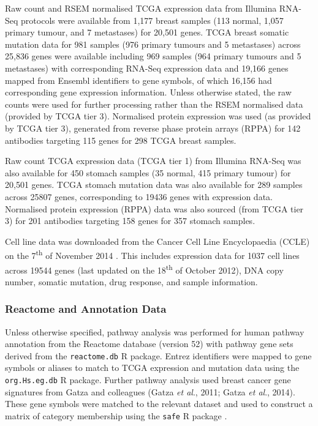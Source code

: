Raw count and RSEM normalised TCGA expression data from Illumina RNA-Seq protocols were available from 1,177 breast samples (113 normal, 1,057 primary tumour, and 7 metastases) for 20,501 genes. TCGA breast somatic mutation data for 981 samples (976 primary tumours and 5 metastases) across 25,836 genes were available including 969 samples (964 primary tumours and 5 metastases) with corresponding RNA-Seq expression data and 19,166 genes mapped from Ensembl identifiers to gene symbols, of which 16,156 had corresponding gene expression information. Unless otherwise stated, the raw counts were used for further processing rather than the RSEM normalised data (provided by TCGA tier 3). Normalised protein expression was used (as provided by TCGA tier 3), generated from reverse phase protein arrays (RPPA) for 142 antibodies targeting 115 genes for 298 TCGA breast samples.

Raw count TCGA expression data (TCGA tier 1) from Illumina RNA-Seq was also available for 450 stomach samples (35 normal, 415 primary tumour) for 20,501 genes. TCGA stomach mutation data was also available for 289 samples across 25807 genes, corresponding to 19436 genes with expression data. Normalised protein expression (RPPA) data was also sourced (from TCGA tier 3) for 201 antibodies targeting 158 genes for 357 stomach samples.

Cell line data was downloaded from the Cancer Cell Line Encyclopaedia (CCLE) on the 7\textsuperscript{th} of November 2014 \citep{Barretina2012, CCLE}. This includes expression data for 1037 cell lines across 19544 genes (last updated on the 18\textsuperscript{th} of October 2012), DNA copy number, somatic mutation, drug response, and sample information. 


\subsubsection{Reactome and Annotation Data} \label{methods:gene_set}

Unless otherwise specified, pathway analysis was performed for human pathway annotation from the Reactome database (version 52) with pathway gene sets derived from the \texttt{reactome.db} R package. Entrez identifiers were mapped to gene symbols or aliases to match to TCGA expression and mutation data using the \texttt{org.Hs.eg.db} R package. Further pathway analysis used breast cancer gene signatures from Gatza and colleagues (Gatza \textit{et al}., 2011; Gatza \textit{et al}., 2014). These gene symbols were matched to the relevant dataset and used to construct a matrix of category membership using the \texttt{safe} R package \citep{safe}.

